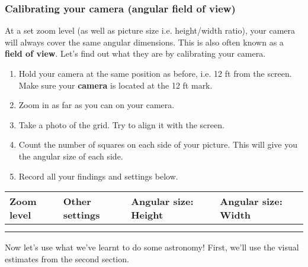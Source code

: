 \documentclass[main.tex]{subfiles}
\begin{document}
\subsubsection{Calibrating your camera (angular field of view)}
At a set zoom level (as well as picture size i.e. height/width ratio), your camera will always cover the same angular dimensions. This is also often known as a \textbf{field of view}. Let's find out what they are by calibrating your camera.

\begin{enumerate}
\item Hold your camera at the same position as before, i.e. 12 ft from the screen. Make sure your \textbf{camera} is located at the 12 ft mark.
\item Zoom in as far as you can on your camera.
\item Take a photo of the grid. Try to align it with the screen.
\item Count the number of squares on each side of your picture. This will give you the angular size of each side.
\item Record all your findings and settings below.
\end{enumerate}

\begin{center}
\begin{tabular}{|p{2.5cm}|p{3cm}|p{4cm}|p{4cm}|}\hline
Zoom level & Other settings & Angular size: Height & Angular size: Width\\\hline
&&&\\
&&&\\\hline
\end{tabular}
\end{center}

Now let's use what we've learnt to do some astronomy! First, we'll use the visual estimates from the second section.
\end{document}
